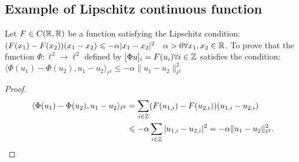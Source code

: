 \subsection{Example of Lipschitz continuous function}
\begin{example}
    Let \(F\in C(\mathbb{R}, \mathbb{R})\) be a function satisfying the Lipschitz condition:
    \((F(x_1)-F(x_2))(x_1-x_2) \leqslant -\alpha |x_1-x_2|^2\quad \alpha>0 \forall x_1,x_2\in\mathbb{R}\).
    To prove that the function \(\Phi:\ell^2\to\ell^2\) defined by
    \([\Phi u]_i=F(u_i)\forall i\in\mathbb{Z}\) satisfies the condition:
    \(\langle\Phi(u_1)-\Phi(u_2), u_1-u_2\rangle_{\ell^2} \leq -\alpha \|u_1-u_2\|^2_{\ell^2}\)
\end{example}
\begin{proof}
    \begin{align*}
        \langle\Phi(u_1)-\Phi(u_2), u_1-u_2\rangle_{\ell^2} &= \sum_{i\in\mathbb{Z}} (F(u_{1,i})-F(u_{2,i}))(u_{1,i}-u_{2,i}) \\
        &\leqslant -\alpha \sum_{i\in\mathbb{Z}} |u_{1,i}-u_{2,i}|^2 = -\alpha \|u_1-u_2\|^2_{\ell^2}.
    \end{align*}
\end{proof}
